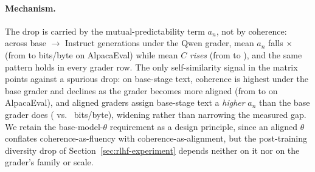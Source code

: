 \begin{table}[h]
\centering
\caption{Share of variance in $D_{Ca_n}$ attributable to the generator stage, the grader $\theta$, and their interaction. Top panel: the five pre-registered grader rows; bottom panel: all seven rows including the cross-family extension, on GPT-2's context-feasible common prompt subset. Cell-mean columns: two-way sum-of-squares decomposition of the grader-by-stage matrix of prompt-averaged $D_{Ca_n}$. Within-prompt columns: three-way decomposition of the grader $\times$ stage $\times$ prompt tensor, reported as shares of the sum of squares remaining after removing the prompt main effect, with each factor credited with its interaction with prompt.}
\label{tab:olmo-matrix-variance}
\small
{}
\end{table}

\paragraph{Mechanism.}
The drop is carried by the mutual-predictability term $a_n$, not by coherence: across base $\to$ Instruct generations under the Qwen grader, mean $a_n$ falls \olmoMxAlpacaAnFoldThetaQwen$\times$ (from \olmoMxAlpacaAnThetaQwenGenBase{} to \olmoMxAlpacaAnThetaQwenGenInstruct{} bits/byte on AlpacaEval) while mean $C$ \emph{rises} (from \olmoMxAlpacaCThetaQwenGenBase{} to \olmoMxAlpacaCThetaQwenGenInstruct), and the same pattern holds in every grader row.
The only self-similarity signal in the matrix points against a spurious drop: on base-stage text, coherence is highest under the base grader and declines as the grader becomes more aligned (from \olmoMxAlpacaCThetaBaseGenBase{} to \olmoMxAlpacaCThetaInstructGenBase{} on AlpacaEval), and aligned graders assign base-stage text a \emph{higher} $a_n$ than the base grader does (\olmoMxAlpacaAnThetaBaseGenBase{} vs.\ \olmoMxAlpacaAnThetaInstructGenBase{} bits/byte), widening rather than narrowing the measured gap.
We retain the base-model-$\theta$ requirement as a design principle, since an aligned $\theta$ conflates coherence-as-fluency with coherence-as-alignment, but the post-training diversity drop of Section~\ref{sec:rlhf-experiment} depends neither on it nor on the grader's family or scale.

